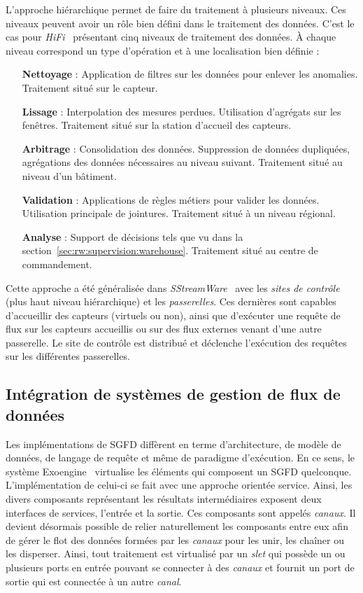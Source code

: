 L'approche hiérarchique permet de faire du traitement à plusieurs niveaux. Ces niveaux peuvent avoir un rôle bien défini dans le traitement des données. C'est le cas pour \textit{HiFi}~\cite{Franklin:hifi} présentant cinq niveaux de traitement des données. À chaque niveau correspond un type d'opération et à une localisation bien définie :
\begin{itemize}
	\item[\textbf{Nettoyage} :] Application de filtres sur les données pour enlever les anomalies. Traitement situé sur le capteur.
	\item[\textbf{Lissage} :] Interpolation des mesures perdues. Utilisation d'agrégats sur les fenêtres. Traitement situé sur la station d'accueil des capteurs.
	\item[\textbf{Arbitrage} :] Consolidation des données. Suppression de données dupliquées, agrégations des données nécessaires au niveau suivant. Traitement situé au niveau d'un bâtiment.
	\item[\textbf{Validation} :] Applications de règles métiers pour valider les données. Utilisation principale de jointures. Traitement situé à un niveau régional.
	\item[\textbf{Analyse} :] Support de décisions tels que vu dans la section~\ref{sec:rw:supervision:warehouse}. Traitement situé au centre de commandement.
\end{itemize}

Cette approche a été généralisée dans \textit{SStreamWare}~\cite{Gurgen:sstreamware} avec les \textit{sites de contrôle} (plus haut niveau hiérarchique) et les \textit{passerelles}. Ces dernières sont capables d'accueillir des capteurs (virtuels ou non), ainsi que d'exécuter une requête de flux sur les capteurs accueillis ou sur des flux externes venant d'une autre passerelle. Le site de contrôle est distribué et déclenche l'exécution des requêtes sur les différentes passerelles.

\subsection{Intégration de systèmes de gestion de flux de données}\label{sec:rw:sgfd:infra:archi}
Les implémentations de SGFD diffèrent en terme d'architecture, de modèle de données, de langage de requête et même de paradigme d'exécution. En ce sens, le système Exoengine~\cite{Duller:virtualdsms} virtualise les éléments qui composent un SGFD quelconque. L'implémentation de celui-ci se fait avec une approche orientée service. Ainsi, les divers composants représentant les résultats intermédiaires exposent deux interfaces de services, l'entrée et la sortie. Ces composants sont appelés \textit{canaux}. Il devient désormais possible de relier naturellement les composants entre eux afin de gérer le flot des données formées par les \textit{canaux} pour les unir, les chaîner ou les disperser. Ainsi, tout traitement est virtualisé par un \textit{slet} qui possède un ou plusieurs ports en entrée pouvant se connecter à des \textit{canaux} et fournit un port de sortie qui est connectée à un autre \textit{canal}.


